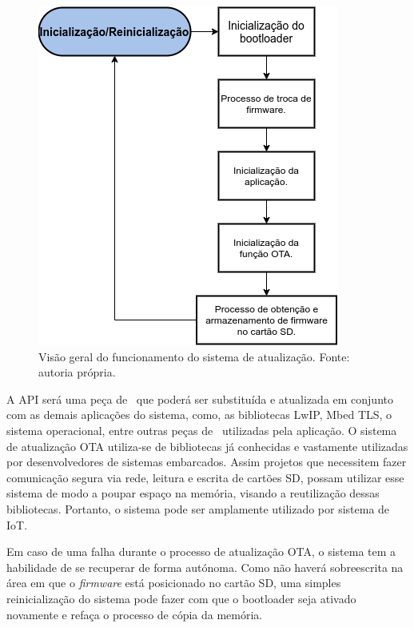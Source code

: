 \begin{figure}[H]
    \scriptsize
     \centering
     \includegraphics[scale=0.8]{dados/figuras/FuncionamentoGeral.png}
     \caption{Visão geral do funcionamento do sistema de atualização. \newline Fonte: autoria própria.}
     \label{fig:visaogeral}
\end{figure}

A API será uma peça de \software\ que poderá ser substituída e atualizada em conjunto com as demais aplicações do sistema, como, as bibliotecas LwIP, Mbed TLS, o sistema operacional, entre outras peças de \software\ utilizadas pela aplicação. 
O sistema de atualização OTA utiliza-se de bibliotecas já conhecidas e vastamente utilizadas por desenvolvedores de sistemas embarcados. Assim projetos que necessitem fazer comunicação segura via rede, leitura e escrita de cartões SD, possam utilizar esse sistema de modo a poupar espaço na memória, visando a reutilização dessas bibliotecas. Portanto, o sistema pode ser amplamente utilizado por sistema de IoT. 

Em caso de uma falha durante o processo de atualização OTA, o sistema tem a habilidade de se recuperar de forma autónoma. Como não haverá sobreescrita na área em que o \textit{firmware} está posicionado no cartão SD, uma simples reinicialização do sistema pode fazer com que o bootloader seja ativado novamente e refaça o processo de cópia da memória.

